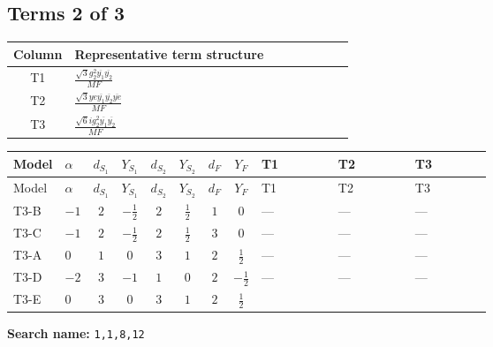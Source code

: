 \documentclass[8pt]{article}
\begin{document}
\begin{landscape}
\subsection*{Terms 2 of 3}
\begin{center}
\begin{tabular}{@{}c >{\raggedright\arraybackslash}p{0.82\linewidth}@{}}
\toprule
Column & Representative term structure \\
\midrule
T1 & \(\displaystyle \frac{\sqrt{3} g_{2}^{2} \overline{y_{1}} \overline{y_{2}}}{MF}\) \\
\midrule
T2 & \(\displaystyle \frac{\sqrt{3} ye \overline{y_{1}} \overline{y_{2}} \overline{ye}}{MF}\) \\
\midrule
T3 & \(\displaystyle \frac{\sqrt{6} i g_{2}^{2} \overline{y_{1}} \overline{y_{2}}}{MF}\) \\
\midrule
\bottomrule
\end{tabular}
\end{center}
\smallskip
\tiny
\begin{longtable}{@{}llcccccc >{\raggedright\arraybackslash}p{0.21\linewidth} >{\raggedright\arraybackslash}p{0.21\linewidth} >{\raggedright\arraybackslash}p{0.21\linewidth}@{}}
\toprule
Model & $\alpha$ & $d_{S_1}$ & $Y_{S_1}$ & $d_{S_2}$ & $Y_{S_2}$ & $d_F$ & $Y_F$ & T1 & T2 & T3 \\
\midrule
\endfirsthead
\toprule
Model & $\alpha$ & $d_{S_1}$ & $Y_{S_1}$ & $d_{S_2}$ & $Y_{S_2}$ & $d_F$ & $Y_F$ & T1 & T2 & T3 \\
\midrule
\endhead
T3-B & $-1$ & $2$ & $-\frac{1}{2}$ & $2$ & $\frac{1}{2}$ & $1$ & $0$ & --- & --- & --- \\
\midrule
T3-C & $-1$ & $2$ & $-\frac{1}{2}$ & $2$ & $\frac{1}{2}$ & $3$ & $0$ & --- & --- & --- \\
\midrule
T3-A & $0$ & $1$ & $0$ & $3$ & $1$ & $2$ & $\frac{1}{2}$ & --- & --- & --- \\
\midrule
T3-D & $-2$ & $3$ & $-1$ & $1$ & $0$ & $2$ & $-\frac{1}{2}$ & --- & --- & --- \\
\midrule
T3-E & $0$ & $3$ & $0$ & $3$ & $1$ & $2$ & $\frac{1}{2}$ & \scriptsize\adjustbox{max width=\linewidth}{$\begin{gathered} \frac{49 \sqrt{3} g_{2}^{2} \overline{y_{1}} \overline{y_{2}}}{24 MF}\end{gathered}$} & \scriptsize\adjustbox{max width=\linewidth}{$\begin{gathered} - \frac{\sqrt{3} ye \overline{y_{1}} \overline{y_{2}} \overline{ye}}{12 MF}\end{gathered}$} & \scriptsize\adjustbox{max width=\linewidth}{$\begin{gathered} \frac{\sqrt{6} i g_{2}^{2} \overline{y_{1}} \overline{y_{2}}}{3 MF}\end{gathered}$} \\
\midrule
\bottomrule
\end{longtable}
\clearpage
\noindent\textbf{Search name: }\texttt{1,1,8,12}\par\smallskip

\end{landscape}
\end{document}
